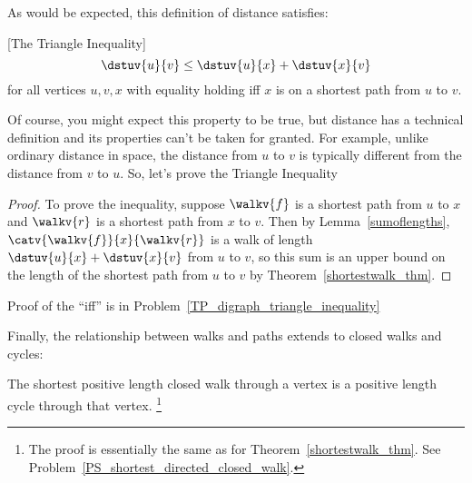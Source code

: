 As would be expected, this definition of distance satisfies:
\begin{lemma}\label{lem:tri-ineq} [The Triangle Inequality]
\[
\dstuv{u}{v} \leq \dstuv{u}{x} + \dstuv{x}{v}
\]
for all vertices $u,v,x$ with equality holding iff $x$ is on a shortest
path from $u$ to $v$.
\end{lemma}
Of course, you might expect this property to be true, but distance has a
technical definition and its properties can't be taken for granted.
For example, unlike ordinary distance in space, the distance from $u$
to $v$ is typically different from the distance from $v$ to $u$.
So, let's prove the Triangle Inequality

\begin{proof}
  To prove the inequality, suppose $\walkv{f}$ is a shortest path from
  $u$ to $x$ and $\walkv{r}$ is a shortest path from $x$ to $v$.  Then
  by Lemma~\ref{sumoflengths}, $\catv{\walkv{f}}{x}{\walkv{r}}$ is a
  walk of length $\dstuv{u}{x} + \dstuv{x}{v}$ from $u$ to $v$, so
  this sum is an upper bound on the length of the shortest path from
  $u$ to $v$ by Theorem~\ref{shortestwalk_thm}.
\end{proof}

Proof of the ``iff'' is in Problem~\ref{TP_digraph_triangle_inequality}
  
Finally, the relationship between walks and paths extends to closed walks and
cycles:
\begin{lemma}\label{shortestclosedwalk_lem}
The shortest positive length closed walk through a vertex is a
positive length cycle through that vertex. \footnote{The proof is
  essentially the same as for Theorem~\ref{shortestwalk_thm}.  See
  Problem~\ref{PS_shortest_directed_closed_walk}.}
\end{lemma}

